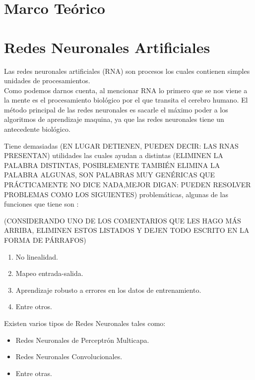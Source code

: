 \section{Marco Teórico}

    
    
    \section{Redes Neuronales Artificiales}
        
        Las redes neuronales artificiales (RNA) son procesos los cuales contienen simples unidades de procesamientos. \\
        Como podemos darnos cuenta, al mencionar RNA lo primero que se nos viene a la mente es el procesamiento biol\'ogico por el que transita el 
        cerebro humano. El m\'etodo principal de las redes neuronales es sacarle el máximo poder a los algoritmos de aprendizaje maquina, ya que las redes neuronales 
        tiene un antecedente biol\'ogico.

        Tiene demasiadas (EN LUGAR DETIENEN, PUEDEN DECIR: LAS RNAS PRESENTAN) utilidades las cuales ayudan a distintas (ELIMINEN LA PALABRA DISTINTAS, POSIBLEMENTE TAMBIÉN ELIMINA LA PALABRA ALGUNAS, SON PALABRAS MUY GENÉRICAS QUE PRÁCTICAMENTE NO DICE NADA,MEJOR DIGAN: PUEDEN RESOLVER PROBLEMAS COMO LOS SIGUIENTES) problemáticas, algunas de las funciones que tiene son \cite{liu2015}:

(CONSIDERANDO UNO DE LOS COMENTARIOS QUE LES HAGO MÁS ARRIBA, ELIMINEN ESTOS LISTADOS Y DEJEN TODO ESCRITO EN LA FORMA DE PÁRRAFOS)
        \begin{enumerate}
            \item No linealidad.
            \item Mapeo entrada-salida.
            \item Aprendizaje robusto a errores en los datos de entrenamiento. 
            \item Entre otros.
        \end{enumerate}

        Existen varios tipos de Redes Neuronales tales como: 
        \begin{itemize}
            \item Redes Neuronales de Perceptr\'on Multicapa.
            \item Redes Neuronales Convolucionales.
            \item Entre otras.
        \end{itemize}
    
